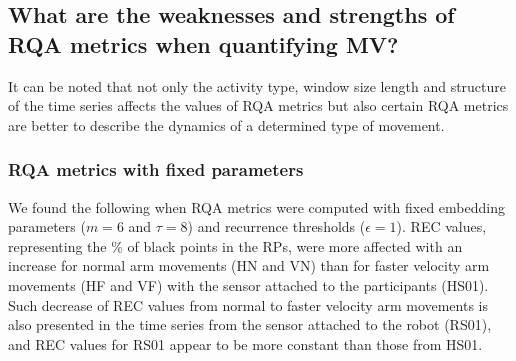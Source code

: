 %

\subsection{What are the weaknesses and strengths of RQA metrics 
	when quantifying MV?}
It can be noted that not only the activity type, window size length and 
structure of the time series affects the values of RQA metrics but also 
certain RQA metrics are better to describe the dynamics of a determined 
type of movement.


\subsubsection{RQA metrics with fixed parameters}
We found the following when RQA metrics were computed with fixed embedding 
parameters ($m=6$ and $\tau=8$) and recurrence thresholds ($\epsilon=1$). 
REC values, representing the \% of black points 
in the RPs, were more affected with an increase for normal arm movements 
(HN and VN) than for faster velocity arm movements (HF and VF) 
with the sensor attached to the participants (HS01). 
Such decrease of REC values from normal to faster velocity arm movements 
is also presented in the time series from the sensor attached 
to the robot (RS01), and REC values for RS01 appear to be more 
constant than those from HS01.
 
